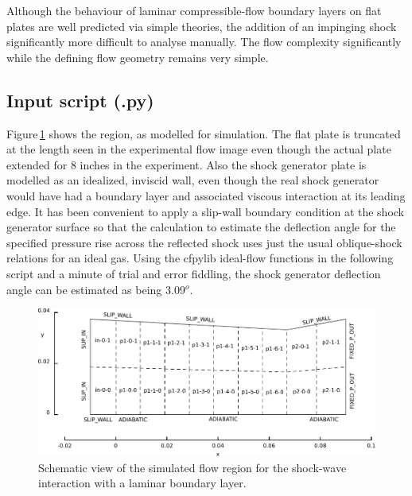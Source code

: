 \medskip
Although the behaviour of laminar compressible-flow boundary layers on flat plates are well predicted 
via simple theories, the addition of an impinging shock significantly more difficult to analyse manually.
The flow complexity significantly while the defining flow geometry remains very simple. 

\bigskip
\subsection{Input script (.py)}
%
Figure\,\ref{fig:hakkinen-geometry} shows the region, as modelled for simulation.
The flat plate is truncated at the length seen in the experimental flow image even though
the actual plate extended for 8 inches in the experiment.
Also the shock generator plate is modelled as an idealized, inviscid wall, even though
the real shock generator would have had a boundary layer and associated viscous interaction
at its leading edge.
It has been convenient to apply a slip-wall boundary condition at the shock generator
surface so that the calculation to estimate the deflection angle for the specified
pressure rise across the reflected shock uses just the usual oblique-shock relations
for an ideal gas.
Using the cfpylib ideal-flow functions in the following script and a minute of trial and error fiddling, 
the shock generator deflection angle can be estimated as being 3.09$^o$.
\topbar

\bottombar

\begin{figure}[htbp]
 \centering
 \includegraphics[width=\textwidth]{../2D/hakkinen-SWLBLI/swlbli-edited.pdf}
 \caption{Schematic view of the simulated flow region for the shock-wave interaction 
          with a laminar boundary layer.}
 \label{fig:hakkinen-geometry}
\end{figure}


